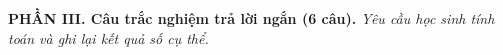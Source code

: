 \documentclass[12pt,a4paper]{article}
\begin{document}
\vspace{5mm}

\noindent\textbf{PHẦN III. Câu trắc nghiệm trả lời ngắn (6 câu).}
\textit{Yêu cầu học sinh tính toán và ghi lại kết quả số cụ thể.}

\end{document}
